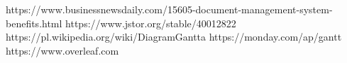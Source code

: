 \documentclass[polish,12pt,twoside,a4paper]{report}
\begin{document}




\newpage

\newpage

\newpage

\newpage

\newpage

\newpage

\begin{thebibliography}{6}

 https://www.businessnewsdaily.com/15605-document-management-system-benefits.html
 https://www.jstor.org/stable/40012822
 https://pl.wikipedia.org/wiki/DiagramGantta
 https://monday.com/ap/gantt
 https://www.overleaf.com
\end{thebibliography}
\newpage


\end{document}
